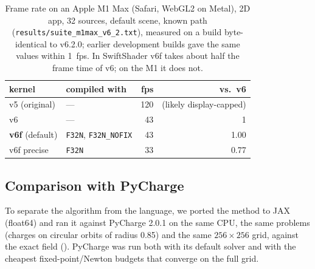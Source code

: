 \documentclass[11pt, a4paper]{article}
\begin{document}
\begin{table}[htbp]
\centering
\begin{tabular}{@{}llrr@{}}
\toprule
kernel & compiled with & fps & vs.\ v6 \\
\midrule
v5 (original) & --- & 120 & (likely display-capped) \\
v6 & --- & 43 & 1 \\
\textbf{v6f} (default) & \texttt{F32N}, \texttt{F32N\_NOFIX} & 43 & 1.00 \\
v6f precise & \texttt{F32N} & 33 & 0.77 \\
\bottomrule
\end{tabular}
\caption{Frame rate on an Apple M1 Max (Safari, WebGL2 on Metal), 2D app, 32 sources, default scene, known path (\texttt{results/suite\_m1max\_v6\_2.txt}), measured on a build byte-identical to v6.2.0; earlier development builds gave the same values within 1~fps. In SwiftShader v6f takes about half the frame time of v6; on the M1 it does not.}
\label{tab:m1}
\end{table}

\subsection{Comparison with PyCharge}
To separate the algorithm from the language, we ported the method to JAX (float64) and ran it against PyCharge 2.0.1 \cite{pycharge2022} on the same CPU, the same problems (charges on circular orbits of radius 0.85) and the same $256\times256$ grid, against the exact field (). PyCharge was run both with its default solver and with the cheapest fixed-point/Newton budgets that converge on the full grid.

\begin{table}[htbp]
\centering
{}
\caption{Float64 on a 2-core CPU, medians of three runs after compilation. PyCharge is exact when it converges ($10^{-11}$--$10^{-14}$); the method here interpolates a sampled history. Errors from the v6.0.0 JAX port; with the Newton fix most fall slightly and the $\beta = 0.999$ entry rises 1.4--1.55$\times$ (\texttt{validation/benchmarks/README.md}).}
\label{tab:pycharge}
\end{table}
\end{document}
